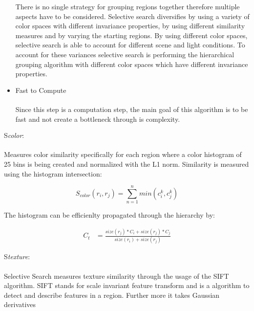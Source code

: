 \begin{itemize}
        There is no single strategy for grouping regions together therefore multiple aspects have to be considered. Selective search
        diversifies by using a variety of color spaces with different invariance properties, by using different similarity measures and by
        varying the starting regions.  By using different color spaces, selective search is able to account for different scene and light
        conditions. To account for these variances selective search is performing the hierarchical grouping algorithm with different color
        spaces which have different invariance properties.
    \item Fast to Compute \\ \\
        Since this step is a computation step, the main goal of this algorithm is to be fast and not create a bottleneck through is
        complexity. \cite{selectivesearch}
\end{itemize}
\large{S}\emph{color}: \\ \\
Measures color similarity specifically for each region where a color histogram of 25 bins is being created and normalized
with the L1 norm. Similarity is measured using the histogram intersection: \cite{selectivesearch} \\
\begin{center}
    \begin{equation*}
        S_{color}(r_i,r_j) = \sum_{n=1}^{n} min(c_i^{k},c_j^{k})
    \end{equation*}\cite{selectivesearch}
\end{center}
\newpage
\noindent
The histogram can be efficienlty propagated through the hierarchy by: \\
\begin{center}
    \begin{equation*}
        \begin{split}
            C_t & = \frac{size(r_j)*C_i+size(r_j)*C_j}{size(r_i)+size(r_j)}
        \end{split}
    \end{equation*}\cite{selectivesearch}
\end{center}
\large{S}\emph{texture}: \\ \\
Selective Search measures texture similarity through the usage of the SIFT algorithm. SIFT stands for scale invariant
feature transform and is a algorithm to detect and describe features in a region. Further more it takes Gaussian derivatives
